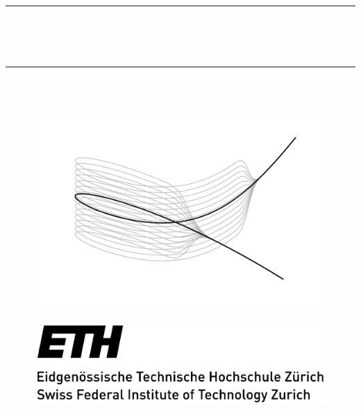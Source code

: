 



\frontmatter

\renewcommand*{\thefootnote}{\fnsymbol{footnote}}

\thispagestyle{empty}

\begin{center}
    \rule{\linewidth}{1mm}\\
	\\
	\\
	\rule{\linewidth}{1mm} \\[.5cm]
	\\
	\vspace{.5cm}
	\begin{figure}[h!tb]
		\centering
		\includegraphics[width = \textwidth]{variation.pdf}
	\end{figure}
	\begin{figure}[h!tb]
		\includegraphics[width = .4\textwidth,left]{ETHZ_Logo.pdf}
	\end{figure}
\end{center}
\clearpage

